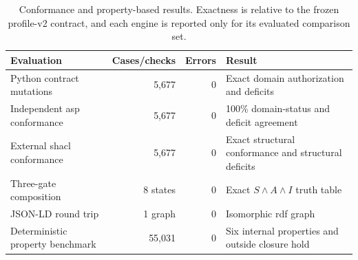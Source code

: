 \begin{table}[!htbp]
\centering
\caption{Conformance and property-based results. Exactness is relative to the frozen profile-v2 contract, and each engine is reported only for its evaluated comparison set.}
\label{tab:standards-formal-results}
\footnotesize
\renewcommand{\arraystretch}{1.08}
\begin{tabularx}{\textwidth}{@{}p{}r r Y@{}}
\toprule
Evaluation & Cases/checks & Errors & Result \\
\midrule
Python contract mutations & 5,677 & 0 & Exact domain authorization and deficits \\
Independent \ac{asp} conformance & 5,677 & 0 & 100\% domain-status and deficit agreement \\
External \ac{shacl} conformance & 5,677 & 0 & Exact structural conformance and structural deficits \\
Three-gate composition & 8 states & 0 & Exact $S\land A\land I$ truth table \\
JSON-LD round trip & 1 graph & 0 & Isomorphic \ac{rdf} graph \\
Deterministic property benchmark & 55,031 & 0 & Six internal properties and outside closure hold \\
\bottomrule
\end{tabularx}
\end{table}
